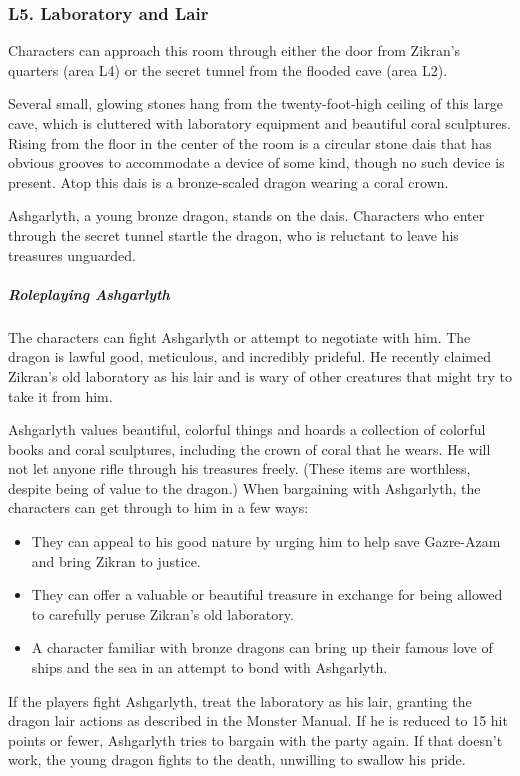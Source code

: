 \documentclass[10pt,a4paper,twoside,bg=print,twocolumn,openany,nodeprecatedcode]{dndbook}
\begin{document}
\subsubsection{L5. Laboratory and Lair}
Characters can approach this room through either the door from Zikran's quarters (area L4) or the secret tunnel from the flooded cave (area L2).

\begin{DndReadAloud}{}
Several small, glowing stones hang from the twenty-foot-high ceiling of this large cave, which is cluttered with laboratory equipment and beautiful coral sculptures. Rising from the floor in the center of the room is a circular stone dais that has obvious grooves to accommodate a device of some kind, though no such device is present. Atop this dais is a bronze-scaled dragon wearing a coral crown.

\end{DndReadAloud}

Ashgarlyth, a young bronze dragon, stands on the dais. Characters who enter through the secret tunnel startle the dragon, who is reluctant to leave his treasures unguarded.

\subparagraph{Roleplaying Ashgarlyth}
The characters can fight Ashgarlyth or attempt to negotiate with him. The dragon is lawful good, meticulous, and incredibly prideful. He recently claimed Zikran's old laboratory as his lair and is wary of other creatures that might try to take it from him.

Ashgarlyth values beautiful, colorful things and hoards a collection of colorful books and coral sculptures, including the crown of coral that he wears. He will not let anyone rifle through his treasures freely. (These items are worthless, despite being of value to the dragon.) When bargaining with Ashgarlyth, the characters can get through to him in a few ways:


\begin{itemize}
\item They can appeal to his good nature by urging him to help save Gazre-Azam and bring Zikran to justice.
\item They can offer a valuable or beautiful treasure in exchange for being allowed to carefully peruse Zikran's old laboratory.
\item A character familiar with bronze dragons can bring up their famous love of ships and the sea in an attempt to bond with Ashgarlyth.
\end{itemize}

If the players fight Ashgarlyth, treat the laboratory as his lair, granting the dragon lair actions as described in the Monster Manual. If he is reduced to 15 hit points or fewer, Ashgarlyth tries to bargain with the party again. If that doesn't work, the young dragon fights to the death, unwilling to swallow his pride.
\end{document}
